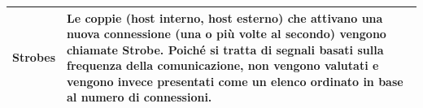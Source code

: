 \begin{center}
\begin{longtable}{|p{}|p{}|}
    Strobes &  
    Le coppie (host interno, host esterno) che attivano una nuova connessione (una o più volte al secondo) vengono chiamate Strobe.
    Poiché si tratta di segnali basati sulla frequenza della comunicazione, non vengono 
    valutati e vengono invece presentati come un elenco ordinato in base al numero di connessioni. 
    \\ 
    \hline  

\end{longtable}
\end{center}
